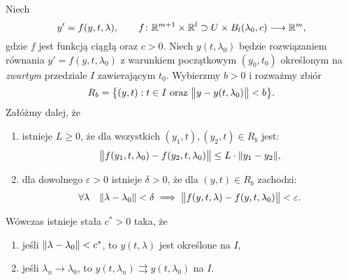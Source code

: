 
\begin{theorem}
  Niech
  \[
    y' = f(y,t,\lambda), \qquad f \colon \R^{m+1} \times \R^l \supset U \times B_l(\lambda_0,c) \longrightarrow \R^m,
  \]
  gdzie $f$ jest funkcją ciągłą oraz $c>0$. Niech $y(t,\lambda_0)$ będzie rozwiązaniem równania $y' = f(y,t,\lambda_0)$ 
  z warunkiem początkowym $(y_0,t_0)$ określonym na \emph{zwartym} przedziale $I$ zawierającym $t_0$. Wybierzmy $b > 0$ 
  i rozważmy zbiór
  \[
    R_b = \big\{ (y,t) : t \in I \text{ oraz } \norm[\big]{ y - y(t,\lambda_0) } < b \big\}.
  \]
  Załóżmy dalej, że
  \begin{enumerate}
    \item istnieje $L \geq 0$, że dla wszystkich $(y_1,t),(y_2,t) \in R_b$ jest:
    \[
      \norm[\big]{ f(y_1,t,\lambda_0) - f(y_2,t,\lambda_0) } \leq L \cdot \norm{y_1-y_2},
    \]
    \item dla dowolnego $\varepsilon>0$ istnieje $\delta>0$, że dla $(y,t) \in R_b$ zachodzi:
    \[
      \forall \lambda \quad \norm{\lambda - \lambda_0} < \delta \implies 
      \norm[\big]{ f(y,t,\lambda) - f(y,t,\lambda_0) } < \varepsilon.
    \]
  \end{enumerate}
  Wówczas istnieje stała $c^{\ast} > 0$ taka, że
  \begin{enumerate}
    \item jeśli $\norm{\lambda-\lambda_0} < c^{\ast}$, to $y(t,\lambda)$ jest określone na $I$,
    \item jeśli $\lambda_n \to \lambda_0$, to $y(t,\lambda_n) \rightrightarrows y(t,\lambda_0)$ na $I$.
  \end{enumerate}
\end{theorem}
